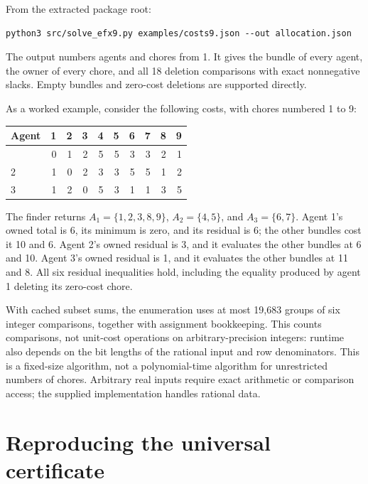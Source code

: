 \documentclass[
  11pt,
]{article}
\newcounter{none} %
\begin{document}
From the extracted package root:

\begin{verbatim}
python3 src/solve_efx9.py examples/costs9.json --out allocation.json
\end{verbatim}

The output numbers agents and chores from 1. It gives the bundle of
every agent, the owner of every chore, and all 18 deletion comparisons
with exact nonnegative slacks. Empty bundles and zero-cost deletions are
supported directly.

As a worked example, consider the following costs, with chores numbered
1 to 9:

{\def\LTcaptype{none} %
\begin{longtable}[]{@{}lrrrrrrrrr@{}}
\toprule\noalign{}
Agent & 1 & 2 & 3 & 4 & 5 & 6 & 7 & 8 & 9 \\
\midrule\noalign{}
\endhead
\bottomrule\noalign{}
\endlastfoot
1 & 0 & 1 & 2 & 5 & 5 & 3 & 3 & 2 & 1 \\
2 & 1 & 0 & 2 & 3 & 3 & 5 & 5 & 1 & 2 \\
3 & 1 & 2 & 0 & 5 & 3 & 1 & 1 & 3 & 5 \\
\end{longtable}
}

The finder returns \(A_1=\{1,2,3,8,9\}\), \(A_2=\{4,5\}\), and
\(A_3=\{6,7\}\). Agent 1's owned total is 6, its minimum is zero, and
its residual is 6; the other bundles cost it 10 and 6. Agent 2's owned
residual is 3, and it evaluates the other bundles at 6 and 10. Agent 3's
owned residual is 1, and it evaluates the other bundles at 11 and 8. All
six residual inequalities hold, including the equality produced by agent
1 deleting its zero-cost chore.

With cached subset sums, the enumeration uses at most 19,683 groups of
six integer comparisons, together with assignment bookkeeping. This
counts comparisons, not unit-cost operations on arbitrary-precision
integers: runtime also depends on the bit lengths of the rational input
and row denominators. This is a fixed-size algorithm, not a
polynomial-time algorithm for unrestricted numbers of chores. Arbitrary
real inputs require exact arithmetic or comparison access; the supplied
implementation handles rational data.

\section{Reproducing the universal
certificate}\label{reproducing-the-universal-certificate}
\end{document}
